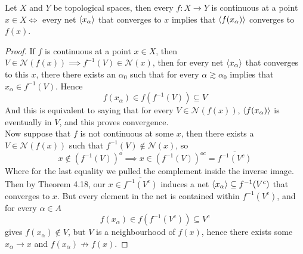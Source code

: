 \documentclass[../../main.tex]{subfiles}
\begin{document}
\begin{wts}
Let $X$ and $Y$ be topological spaces, then every $f:X\to Y$ is continuous at a point $x\in X\iff$ every net $\langle {x_\alpha} \rangle$ that converges to $x$ implies that $\langle {f(x_\alpha)} \rangle$ converges to $f(x)$.
\end{wts}
\newcommand{\n}[1]{\mathcal{N}({#1})}
\begin{proof}
If $f$ is continuous at a point $x\in X$, then $V\in\n{f(x)}\implies f^{-1}(V)\in\n{x}$, then for every net $\langle {x_\alpha} \rangle$ that converges to this $x$, there there exists an $\alpha_0$ such that for every $\alpha\gtrsim\alpha_0$ implies that $x_\alpha\in f^{-1}(V)$. Hence 
\[
f(x_\alpha)\in f\left(f^{-1}(V)\right)\subseteq V
\]
And this is equivalent to saying that for every $V\in\n{f(x)}$, $\langle {f(x_\alpha)} \rangle$ is eventually in $V$, and this proves convergence.\\

Now suppose that $f$ is not continuous at some $x$, then there exists a $V\in\n{f(x)}$ such that $f^{-1}(V)\notin\n{x}$, so 
\[
x\notin \left(f^{-1}(V)\right)^o\implies x\in \left(f^{-1}(V)\right)^{oc}=\overline{f^{-1}(V^c)}
\]
Where for the last equality we pulled the complement inside the inverse image. Then by Theorem 4.18, our $x\in\overline{f^{-1}(V^c)}$ induces a net $\langle {x_\alpha} \rangle\subseteq f^{-1}(V^c)$ that converges to $x$. But every element in the net is contained within $f^{-1}(V^c)$, and for every $\alpha\in A$
\[
f(x_\alpha)\in f\left(f^{-1}(V^c)\right)\subseteq V^c
\]
gives $f(x_\alpha)\notin V$, but $V$ is a neighbourhood of $f(x)$, hence there exists some $x_\alpha\to x$ and $f(x_\alpha)\not\to f(x)$.
\end{proof}
\end{document}

